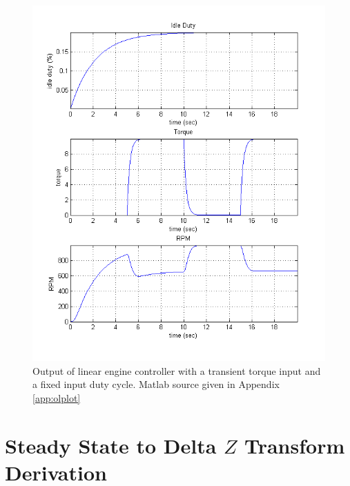 \documentclass{article}
\begin{document}
\begin{figure}
\begin{center}
\includegraphics[scale=0.8]{img/linear_engine_model_no_control_plot}
\end{center}
\caption{Output of linear engine controller with a transient torque
input and a fixed input duty cycle.  Matlab source given in
Appendix \ref{app:olplot}}
\label{fig:olplot}
\end{figure}

\clearpage
\printbibliography[heading=bibintoc]

\clearpage
\appendix

\section{Steady State to Delta $Z$ Transform Derivation}
\label{app:cdelta}
\end{document}
